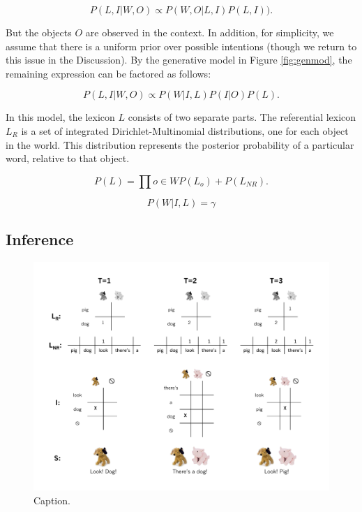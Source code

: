 \documentclass[man,noapacite]{apa2}
\begin{document}
\begin{equation}
P(L, I| W, O) \propto P(W, O | L, I) P(L, I)).
\end{equation}

\noindent But the objects $O$ are observed in the context. In addition, for simplicity, we assume that there is a uniform prior over possible intentions (though we return to this issue in the Discussion). By the generative model in Figure \ref{fig:genmod}, the remaining expression can be factored as follows:

\begin{equation}
P(L, I| W, O) \propto P(W | I, L) P(I | O) P(L).
\end{equation}

In this model, the lexicon $L$ consists of two separate parts. The referential lexicon $L_R$ is a set of integrated Dirichlet-Multinomial distributions, one for each object in the world. This distribution represents the posterior probability of a particular word, relative to that object. 

\begin{equation}
P(L) = \prod{o \in W}{P(L_o)} + P(L_{NR}).
\end{equation}

 

\begin{equation}
P(W | I, L) = \gamma  
\end{equation}


\subsection{Inference}
\begin{figure}[tr]
\begin{center}
\includegraphics[width=6.5in]{figures/inference_diagram.pdf}
\caption{\label{fig:inference_diagram} Caption.}
\end{center}
\end{figure}
\end{document}
